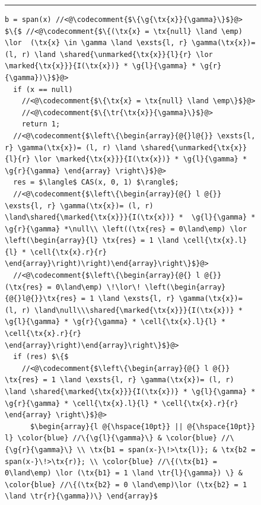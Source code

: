 \begin{figure}
\hrule    
\begin{lstlisting}
b = span(x) //<@\codecomment{$\{\g{\tx{x}}{\gamma}\}$}@>
$\{$ //<@\codecomment{$\{(\tx{x} = \tx{null} \land \emp) \lor  (\tx{x} \in \gamma \land \exsts{l, r} \gamma(\tx{x})= (l, r) \land \shared{\unmarked{\tx{x}}{l}{r} \lor \marked{\tx{x}}}{I(\tx{x})} * \g{l}{\gamma} * \g{r}{\gamma})\}$}@>
  if (x == null)
    //<@\codecomment{$\{\tx{x} = \tx{null} \land \emp\}$}@>
    //<@\codecomment{$\{\tr{\tx{x}}{\gamma}\}$}@>
    return 1;
  //<@\codecomment{$\left\{\begin{array}{@{}l@{}} \exsts{l, r} \gamma(\tx{x})= (l, r) \land \shared{\unmarked{\tx{x}}{l}{r} \lor \marked{\tx{x}}}{I(\tx{x})} * \g{l}{\gamma} * \g{r}{\gamma} \end{array} \right\}$}@>
  res = $\langle$ CAS(x, 0, 1) $\rangle$;
  //<@\codecomment{$\left\{\begin{array}{@{} l @{}} \exsts{l, r} \gamma(\tx{x})= (l, r) \land\shared{\marked{\tx{x}}}{I(\tx{x})} *  \g{l}{\gamma} * \g{r}{\gamma} *\null\\ \left((\tx{res} = 0\land\emp) \lor  \left(\begin{array}{l} \tx{res} = 1 \land \cell{\tx{x}.l}{l} * \cell{\tx{x}.r}{r} \end{array}\right)\right)\end{array}\right\}$}@>
  //<@\codecomment{$\left\{\begin{array}{@{} l @{}} (\tx{res} = 0\land\emp) \!\lor\! \left(\begin{array}{@{}l@{}}\tx{res} = 1 \land \exsts{l, r} \gamma(\tx{x})= (l, r) \land\null\\\shared{\marked{\tx{x}}}{I(\tx{x})} *  \g{l}{\gamma} * \g{r}{\gamma} * \cell{\tx{x}.l}{l} * \cell{\tx{x}.r}{r} \end{array}\right)\end{array}\right\}$}@>
  if (res) $\{$ 
    //<@\codecomment{$\left\{\begin{array}{@{} l @{}} \tx{res} = 1 \land \exsts{l, r} \gamma(\tx{x})= (l, r) \land \shared{\marked{\tx{x}}}{I(\tx{x})} * \g{l}{\gamma} * \g{r}{\gamma} * \cell{\tx{x}.l}{l} * \cell{\tx{x}.r}{r}    \end{array} \right\}$}@>
      $\begin{array}{l @{\hspace{10pt}} || @{\hspace{10pt}} l} \color{blue} //\{\g{l}{\gamma}\} & \color{blue} //\{\g{r}{\gamma}\} \\ \tx{b1 = span(x-}\!>\tx{l)}; & \tx{b2 = span(x-}\!>\tx{r)}; \\ \color{blue} //\{(\tx{b1} = 0\land\emp) \lor (\tx{b1} = 1 \land \tr{l}{\gamma}) \} & \color{blue} //\{(\tx{b2} = 0 \land\emp)\lor (\tx{b2} = 1 \land \tr{r}{\gamma})\} \end{array}$

\end{lstlisting}
\end{figure}
